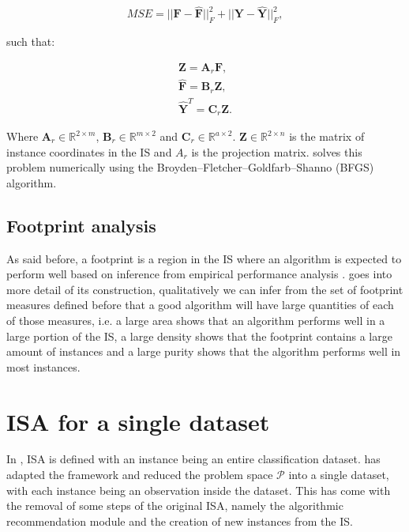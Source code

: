 \begin{equation}
	MSE = ||\mathbf{F} - \mathbf{\hat{F}}||_F^2 + ||\mathbf{Y} - \mathbf{\hat{Y}}||_F^2,
\end{equation}

such that:

\begin{gather}
	\mathbf{Z} = \mathbf{A}_r \mathbf{F} \label{eq:z_is}, \\
	\mathbf{\hat{F}} = \mathbf{B}_r \mathbf{Z} \label{eq:f_hat}, \\
	\mathbf{\hat{Y}}^T = \mathbf{C}_r \mathbf{Z} \label{eq:y_hat}.
\end{gather}

Where $\mathbf{A}_r \in \mathbb{R}^{2 \times m}$, $\mathbf{B}_r \in \mathbb{R}^{m \times 2}$ and $\mathbf{C}_r \in \mathbb{R}^{a \times 2}$. $\mathbf{Z} \in \mathbb{R}^{2 \times n}$ is the matrix of instance coordinates in the IS and $A_r$ is the projection matrix.  solves this problem numerically using the Broyden–Fletcher–Goldfarb–Shanno (BFGS) algorithm.

\subsection{Footprint analysis}

As said before, a footprint is a region in the IS where an algorithm is expected to perform well based on inference from empirical performance analysis \cite{Munoz2018}.  goes into more detail of its construction, qualitatively we can infer from the set of footprint measures defined before that a good algorithm will have large quantities of each of those measures, i.e. a large area shows that an algorithm performs well in a large portion of the IS, a large density shows that the footprint contains a large amount of instances and a large purity shows that the algorithm performs well in most instances.

\section{ISA for a single dataset}

In , ISA is defined with an instance being an entire classification dataset.  has adapted the framework and reduced the problem space $\mathcal{P}$ into a single dataset, with each instance being an observation inside the dataset. This has come with the removal of some steps of the original ISA, namely the algorithmic recommendation module and the creation of new instances from the IS.

